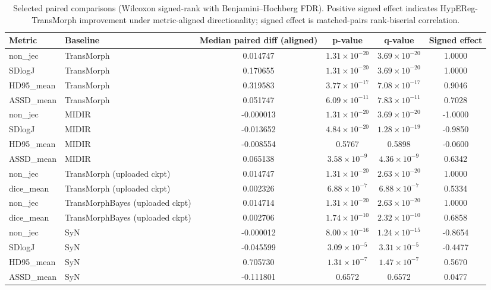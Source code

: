 \documentclass[11pt,a4paper]{article}
\begin{document}
\begin{table}[H]
\caption{Selected paired comparisons (Wilcoxon signed-rank with Benjamini--Hochberg FDR). Positive signed effect indicates HypEReg-TransMorph improvement under metric-aligned directionality; signed effect is matched-pairs rank-biserial correlation.}
\scriptsize
\setlength{\tabcolsep}{3pt}
\begin{tabularx}{\textwidth}{llcccc}
\toprule
\textbf{Metric} & \textbf{Baseline} & \textbf{Median paired diff (aligned)} & \textbf{p-value} & \textbf{q-value} & \textbf{Signed effect}\\
\midrule
non\_jec & TransMorph & 0.014747 & \(1.31\times 10^{-20}\) & \(3.69\times 10^{-20}\) & 1.0000 \\
SDlogJ & TransMorph & 0.170655 & \(1.31\times 10^{-20}\) & \(3.69\times 10^{-20}\) & 1.0000 \\
HD95\_mean & TransMorph & 0.319583 & \(3.77\times 10^{-17}\) & \(7.08\times 10^{-17}\) & 0.9046 \\
ASSD\_mean & TransMorph & 0.051747 & \(6.09\times 10^{-11}\) & \(7.83\times 10^{-11}\) & 0.7028 \\
\midrule
non\_jec & MIDIR & -0.000013 & \(1.31\times 10^{-20}\) & \(3.69\times 10^{-20}\) & -1.0000 \\
SDlogJ & MIDIR & -0.013652 & \(4.84\times 10^{-20}\) & \(1.28\times 10^{-19}\) & -0.9850 \\
HD95\_mean & MIDIR & -0.008554 & 0.5767 & 0.5898 & -0.0600 \\
ASSD\_mean & MIDIR & 0.065138 & \(3.58\times 10^{-9}\) & \(4.36\times 10^{-9}\) & 0.6342 \\
\midrule
non\_jec & TransMorph (uploaded ckpt) & 0.014747 & \(1.31\times 10^{-20}\) & \(2.63\times 10^{-20}\) & 1.0000 \\
dice\_mean & TransMorph (uploaded ckpt) & 0.002326 & \(6.88\times 10^{-7}\) & \(6.88\times 10^{-7}\) & 0.5334 \\
non\_jec & TransMorphBayes (uploaded ckpt) & 0.014714 & \(1.31\times 10^{-20}\) & \(2.63\times 10^{-20}\) & 1.0000 \\
dice\_mean & TransMorphBayes (uploaded ckpt) & 0.002706 & \(1.74\times 10^{-10}\) & \(2.32\times 10^{-10}\) & 0.6858 \\
\midrule
non\_jec & SyN & -0.000012 & \(8.00\times 10^{-16}\) & \(1.24\times 10^{-15}\) & -0.8654 \\
SDlogJ & SyN & -0.045599 & \(3.09\times 10^{-5}\) & \(3.31\times 10^{-5}\) & -0.4477 \\
HD95\_mean & SyN & 0.705730 & \(1.31\times 10^{-7}\) & \(1.47\times 10^{-7}\) & 0.5670 \\
ASSD\_mean & SyN & -0.111801 & 0.6572 & 0.6572 & 0.0477 \\
\bottomrule
\end{tabularx}
\end{table}
\end{document}
